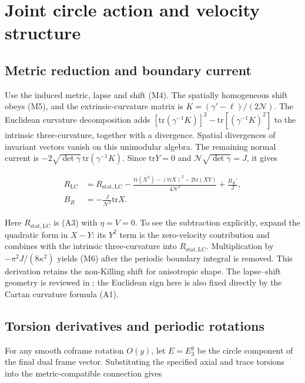 \section{Joint circle action and velocity structure}

\label{app:J}

\subsection{Metric reduction and boundary current}

Use the induced metric, lapse and shift (M4). The spatially homogeneous shift obeys (M5), and the extrinsic-curvature matrix is $K=(\gamma'-\ell)/(2\mathcal N)$. The Euclidean curvature decomposition adds $[\mathrm{tr}(\gamma^{-1}K)]^2-\mathrm{tr}[(\gamma^{-1}K)^2]$ to the intrinsic three-curvature, together with a divergence. Spatial divergences of invariant vectors vanish on this unimodular algebra. The remaining normal current is $-2\sqrt{\det\gamma}\,\mathrm{tr}(\gamma^{-1}K)$. Since $\mathrm{tr}Y=0$ and $\mathcal N\sqrt{\det\gamma}=J$, it gives

\begin{equation}\tag{J1}\label{eq:J1}
\begin{aligned}
R_{\mathrm{LC}}&=R_{\mathrm{stat,LC}}
-\frac{\mathrm{tr}(X^2)-(\mathrm{tr}X)^2-2\mathrm{tr}(XY)}
{4\mathcal N^2}+\frac{B_R'}{J},\\
B_R&=-\frac{J}{\mathcal N^2}\mathrm{tr}X.
\end{aligned}
\end{equation}

Here $R_{\mathrm{stat,LC}}$ is (A3) with $\eta=V=0$. To see the subtraction explicitly, expand the quadratic form in $X-Y$: its $Y^2$ term is the zero-velocity contribution and combines with the intrinsic three-curvature into $R_{\mathrm{stat,LC}}$. Multiplication by $-\pi^2J/(8\kappa^2)$ yields (M6) after the periodic boundary integral is removed. This derivation retains the non-Killing shift for anisotropic shape. The lapse--shift geometry is reviewed in \cite{ADM}; the Euclidean sign here is also fixed directly by the Cartan curvature formula (A1).

\subsection{Torsion derivatives and periodic rotations}

For any smooth coframe rotation $O(y)$, let $E=E_3^y$ be the circle component of the final dual frame vector. Substituting the specified axial and trace torsions into the metric-compatible connection gives


